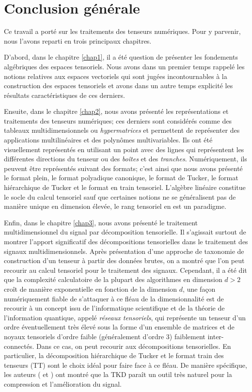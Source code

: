 \documentclass[11pt,a4paper,oneside]{book}
\begin{document}
{
\chapter*{Conclusion générale}
Ce travail a porté sur les traitements des tenseurs numériques. Pour y parvenir, nous l'avons reparti en trois principaux chapitres.
\par D'abord, dans le chapitre \ref{chap1}, il a été question de présenter les fondements algébriques des espaces tensoriels. Nous avons dans un premier temps rappelé les notions relatives aux espaces vectoriels qui sont jugées incontournables à la construction des espaces tensoriels et avons dans un autre temps explicité les résultats caractéristiques de ces derniers.
\par Ensuite, dans le chapitre \ref{chap2}, nous avons présenté les représentations et traitements des tenseurs numériques; ces derniers sont considérés comme des tableaux multidimensionnels ou \textit{hypermatrices} et permettent de représenter des applications multilinéaires et des polynômes multivariables. Ils ont été visuellement représentés en utilisant un point avec des lignes qui représentent les différentes directions du tenseur ou des \textit{boîtes} et des \textit{tranches}. Numériquement, ils peuvent être représentés suivant des formats; c'est ainsi que nous avons présenté le format plein, le format polyadique canonique, le format de Tucker, le format hiérarchique de Tucker et le format en train tensoriel. L'algèbre linéaire constitue le socle du calcul tensoriel sauf que certaines notions ne se généralisent pas de manière unique en dimension élevée, le rang tensoriel en est un paradigme.
 \par Enfin, dans le chapitre \ref{chap3}, nous avons présenté le traitement multidimensionnel du signal par décomposition tensorielle. Il s'agissait surtout de montrer l'apport significatif des décompositions tensorielles dans le traitement des signaux multidimensionnels. Après présentation d'une approche de taxonomie de construction d'un tenseur à partir des données brutes, on a montré que l'on peut recourir au calcul tensoriel pour le traitement des signaux. Cependant, il a été dit que la complexité calculatoire de la plupart des algorithmes en dimension $d>2$ croît de manière exponentielle en fonction de la dimension $d$, une façon numériquement fiable de s'attaquer à ce fléau de la dimensionnalité est de recourir à un concept issu de l'informatique scientifique et de la théorie de l'information quantique, appelé \textit{réseaux tensoriels}, qui représente un tenseur d'un ordre éventuellement très élevé sous la forme d'un ensemble de matrices et de noyaux tensoriels d'ordre faible (généralement d'ordre 3) faiblement inter-connectés. Dans ce cas, on peut recourir aux décompositions tensorielles. En particulier, la décomposition hiérarchique de Tucker et le format train  des tenseurs (TT) sont le choix idéal pour faire face à ce fléau. De manière spécifique, les auteurs (\cite{MUTIfrance} et \cite{cichocki2015tensor}) ont montré que la TKD paraît un outil très naturel pour la compression et l'amélioration du signal.
}
\end{document}
